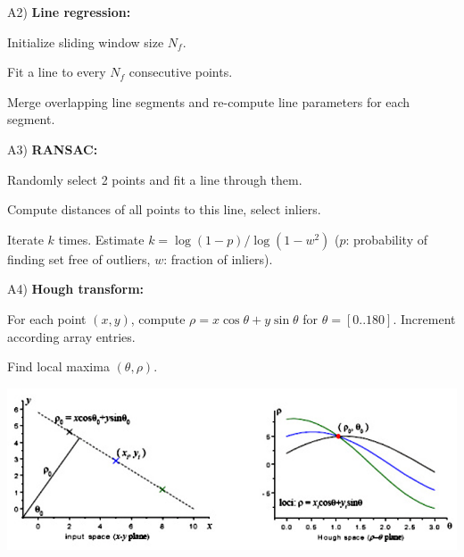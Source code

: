 \documentclass[landscape]{article}
\newcommand{\vmspace}{\vspace{-7pt}}
\newcommand{\vpspace}{\vspace{5pt}}
\begin{document}
\begin{multicols}{3}
\vpspace

\begin{minipage}{\columnwidth}
  A2) \textbf{Line regression:}
  \begin{compactenum}
  \item Initialize sliding window size $N_f$.
  \item Fit a line to every $N_f$ consecutive points.
  \item Merge overlapping line segments and re-compute line parameters for each
    segment.
  \end{compactenum}
\end{minipage}

\vpspace

\begin{minipage}{\columnwidth}
  A3) \textbf{RANSAC:}
  \begin{compactenum}
  \item Randomly select 2 points and fit a line through them.
  \item Compute distances of all points to this line, select inliers.
  \item Iterate $k$ times. Estimate $k=\log(1-p)/\log(1-w^2)$ ($p$:
    probability of finding set free of outliers, $w$: fraction of inliers).
  \end{compactenum}
\end{minipage}

\vpspace

\begin{minipage}{\columnwidth}
  A4) \textbf{Hough transform:}
  \begin{compactenum}
  \item For each point $(x,y)$, compute $\rho = x\cos\theta + y\sin\theta$ for
    $\theta=[0..180]$. Increment according array entries.
  \item Find local maxima $(\theta,\rho)$.
  \end{compactenum}
  \vmspace
  \begin{center}
    \includegraphics[width=0.9\columnwidth]{img/7_Hough.png}
  \end{center}
\end{minipage}



\end{multicols}
\end{document}
